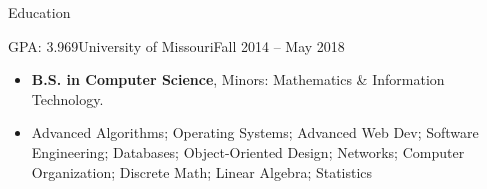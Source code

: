 \documentclass[]{mcdowellcv}
\begin{document}
    \makeheader
    
    \begin{cvsection}{Education}
        \begin{cvsubsection}{GPA: 3.969}{University of Missouri}{Fall 2014 -- May 2018}
            \begin{itemize}
                \item \textbf{B.S. in Computer Science}, Minors: Mathematics \& Information Technology.
                \item Advanced Algorithms; Operating Systems; Advanced Web Dev; Software Engineering; Databases; Object-Oriented Design; Networks; Computer Organization; Discrete Math; Linear Algebra; Statistics
            \end{itemize}
        \end{cvsubsection}
    \end{cvsection}
    
\end{document}
